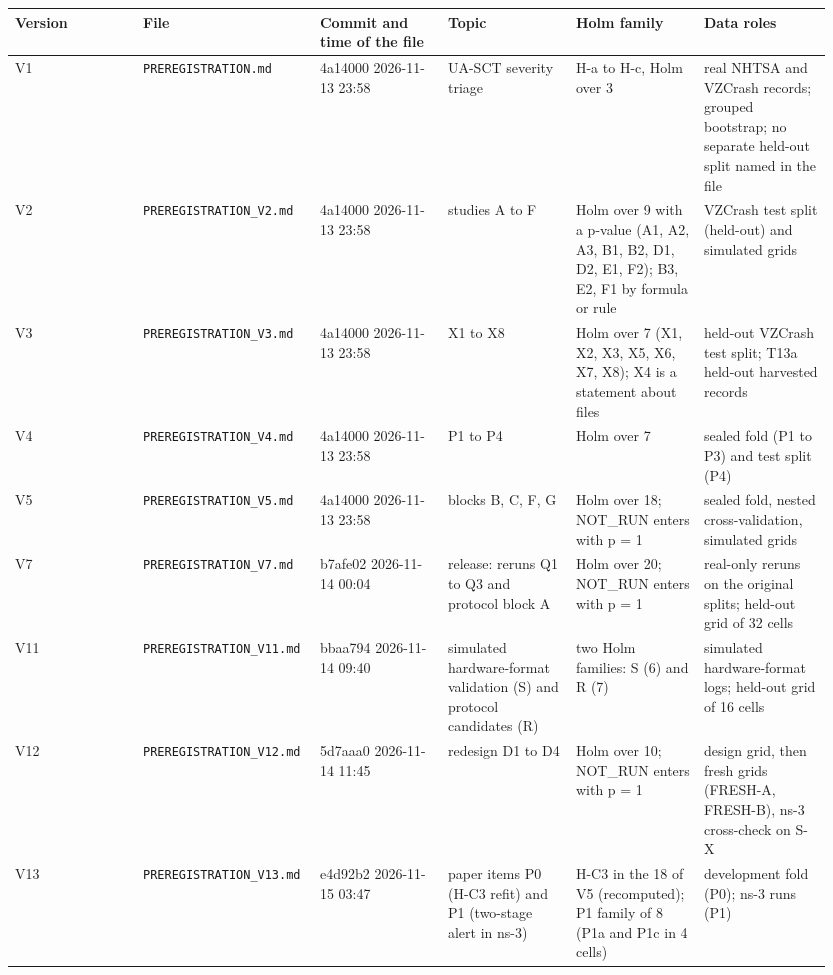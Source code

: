 {\scriptsize\raggedright
\begin{longtable}{p{0.158\linewidth}p{0.158\linewidth}p{0.158\linewidth}p{0.158\linewidth}p{0.158\linewidth}p{0.158\linewidth}}
\toprule
Version & File & Commit and time of the file & Topic & Holm family & Data roles \\
\midrule
\endhead
V1 & \texttt{PREREGISTRATION.md} & 4a14000 2026-11-13 23:58 & UA-SCT severity triage & H-a to H-c, Holm over 3 & real NHTSA and VZCrash records; grouped bootstrap; no separate held-out split named in the file \\
V2 & \texttt{PREREGISTRATION\_V2.md} & 4a14000 2026-11-13 23:58 & studies A to F & Holm over 9 with a p-value (A1, A2, A3, B1, B2, D1, D2, E1, F2); B3, E2, F1 by formula or rule & VZCrash test split (held-out) and simulated grids \\
V3 & \texttt{PREREGISTRATION\_V3.md} & 4a14000 2026-11-13 23:58 & X1 to X8 & Holm over 7 (X1, X2, X3, X5, X6, X7, X8); X4 is a statement about files & held-out VZCrash test split; T13a held-out harvested records \\
V4 & \texttt{PREREGISTRATION\_V4.md} & 4a14000 2026-11-13 23:58 & P1 to P4 & Holm over 7 & sealed fold (P1 to P3) and test split (P4) \\
V5 & \texttt{PREREGISTRATION\_V5.md} & 4a14000 2026-11-13 23:58 & blocks B, C, F, G & Holm over 18; NOT\_RUN enters with p = 1 & sealed fold, nested cross-validation, simulated grids \\
V7 & \texttt{PREREGISTRATION\_V7.md} & b7afe02 2026-11-14 00:04 & release: reruns Q1 to Q3 and protocol block A & Holm over 20; NOT\_RUN enters with p = 1 & real-only reruns on the original splits; held-out grid of 32 cells \\
V11 & \texttt{PREREGISTRATION\_V11.md} & bbaa794 2026-11-14 09:40 & simulated hardware-format validation (S) and protocol candidates (R) & two Holm families: S (6) and R (7) & simulated hardware-format logs; held-out grid of 16 cells \\
V12 & \texttt{PREREGISTRATION\_V12.md} & 5d7aaa0 2026-11-14 11:45 & redesign D1 to D4 & Holm over 10; NOT\_RUN enters with p = 1 & design grid, then fresh grids (FRESH-A, FRESH-B), ns-3 cross-check on S-X \\
V13 & \texttt{PREREGISTRATION\_V13.md} & e4d92b2 2026-11-15 03:47 & paper items P0 (H-C3 refit) and P1 (two-stage alert in ns-3) & H-C3 in the 18 of V5 (recomputed); P1 family of 8 (P1a and P1c in 4 cells) & development fold (P0); ns-3 runs (P1) \\

\end{longtable}}
